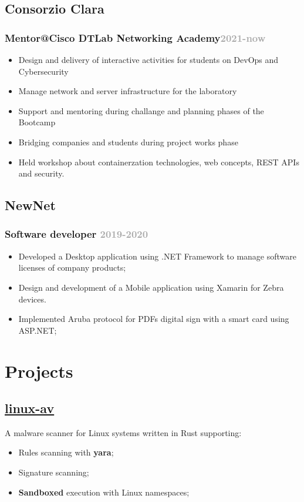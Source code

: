 \documentclass[10pt,a4paper]{article}
\begin{document}
  \subsection{Consorzio Clara}
  \subsubsection{Mentor@Cisco DTLab Networking Academy\hfill \textcolor{darkgray}{\small{2021-now}}}

  \begin{itemize}
    \item Design and delivery of interactive activities for students on DevOps and Cybersecurity
    \item Manage network and server infrastructure for the laboratory
    \item Support and mentoring during challange and planning phases of the Bootcamp
    \item Bridging companies and students during project works phase
    \item Held workshop about containerzation technologies, web concepts, REST APIs and security.  
  \end{itemize}

  \subsection{NewNet}
  \subsubsection{Software developer \hfill \textcolor{darkgray}{\small{2019-2020}}}
  \begin{itemize}
    \item Developed a Desktop application using .NET Framework to manage software licenses of company products;
    \item Design and development of a Mobile application using Xamarin for Zebra devices.
    \item Implemented Aruba protocol for PDFs digital sign with a smart card using ASP.NET;
  \end{itemize}

  \section{Projects}
  \subsection{\href{https://github.com/alarmfox/linux-av}{linux-av}} A malware scanner for Linux systems written in Rust supporting:
 \begin{itemize}
  \item Rules scanning with \textbf{yara};
  \item Signature scanning;
  \item \textbf{Sandboxed} execution with Linux namespaces;
 \end{itemize}
  
\end{document}
